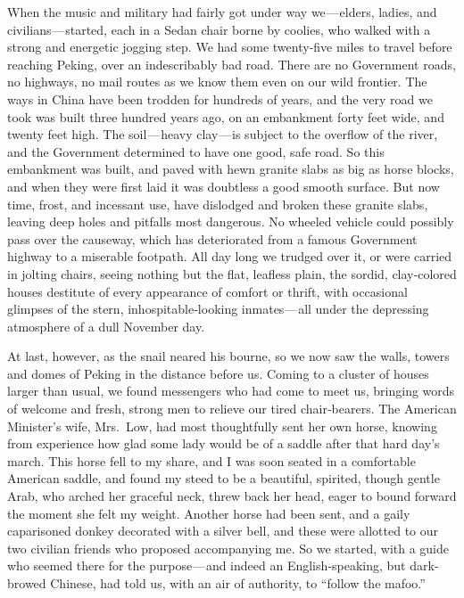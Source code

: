 \documentclass[12pt]{book}
\begin{document}
When the music and military had fairly got under way we — elders, ladies,
and civilians — started, each in a Sedan chair borne by coolies, who walked with a
strong and energetic jogging step. We had some twenty‐five miles to travel before
reaching Peking, over an indescribably bad road. There are no Government roads,
no highways, no mail routes as we know them even on our wild frontier. The
ways in China have been trodden for hundreds of years, and the very road we
took was built three hundred years ago, on an embankment forty feet wide, and
twenty feet high. The soil — heavy clay — is subject to the overflow of the river,
and the Government determined to have one good, safe road. So this embankment
was built, and paved with hewn granite slabs as big as horse blocks, and when
they were first laid it was doubtless a good smooth surface. But now time, frost,
and incessant use, have dislodged and broken these granite slabs, leaving deep
holes and pitfalls most dangerous. No wheeled vehicle could possibly pass over
the causeway, which has deteriorated from a famous Government highway to a
miserable footpath. All day long we trudged over it, or were carried in jolting
chairs, seeing nothing but the flat, leafless plain, the sordid, clay‐colored houses
destitute of every appearance of comfort or thrift, with occasional glimpses of
the stern, inhospitable‐looking inmates — all under the depressing atmosphere of
a dull November day.

At last, however, as the snail neared his bourne, so we now saw the walls,
towers and domes of Peking in the distance before us. Coming to a cluster
of houses larger than usual, we found messengers who had come to meet us,
bringing words of welcome and fresh, strong men to relieve our tired chair‐bearers.
The American Minister’s wife, Mrs.~Low, had most thoughtfully sent her own
horse, knowing from experience how glad some lady would be of a saddle after
that hard day’s march. This horse fell to my share, and I was soon seated in
a comfortable American saddle, and found my steed to be a beautiful, spirited,
though gentle Arab, who arched her graceful neck, threw back her head, eager to
bound forward the moment she felt my weight. Another horse had been sent, and
a gaily caparisoned donkey decorated with a silver bell, and these were allotted
to our two civilian friends who proposed accompanying me. So we started, with
a guide who seemed there for the purpose — and indeed an English‐speaking, but
dark‐browed Chinese, had told us, with an air of authority, to “follow the mafoo.”
\end{document}
